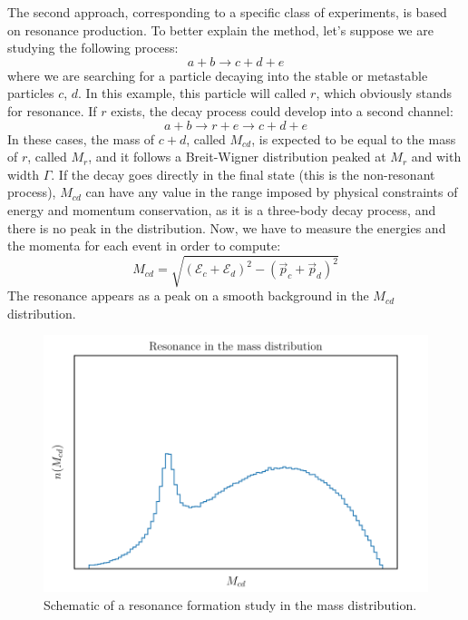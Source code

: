 The second approach, corresponding to a specific class of experiments, is based on resonance production. To better explain the method, let's suppose we are studying the following process:
\begin{equation}
	a + b \rightarrow c + d + e
\end{equation}
where we are searching for a particle decaying into the stable or metastable particles $c$, $d$. In this example, this particle will called $r$, which obviously stands for resonance. If $r$ exists, the decay process could develop into a second channel:
\begin{equation}
	a + b \rightarrow r + e \rightarrow c + d + e
\end{equation}
In these cases, the mass of $c+d$, called $M_{cd}$, is expected to be equal to the mass of $r$, called $M_{r}$, and it follows a Breit-Wigner distribution peaked at $M_{r}$ and with width $\Gamma$. If the decay goes directly in the final state (this is the non-resonant process), $M_{cd}$ can have any value in the range imposed by physical constraints of energy and momentum conservation, as it is a three-body decay process, and there is no peak in the distribution. Now, we have to measure the energies and the momenta for each event in order to compute:
\begin{equation}
	M_{cd} = \sqrt{(\mathcal{E}_{c} + \mathcal{E}_{d})^2 - (\vec{p}_{c} + \vec{p}_{d})^2}
\end{equation}
The resonance appears as a peak on a smooth background in the $M_{cd}$ distribution.


\begin{figure}[H]
\centering%
\begin{minipage}{0.4\textwidth}
	\centering
	
\end{minipage}
%
\begin{minipage}{0.4\textwidth}\centering
	\includegraphics[width=1.0\linewidth]{Python/LHC/RES/res2.pdf}
\end{minipage}%

\caption{Schematic of a resonance formation study in the mass distribution.}
\label{fig:INVARIANT_MASS_RESONANCE}
\end{figure}






